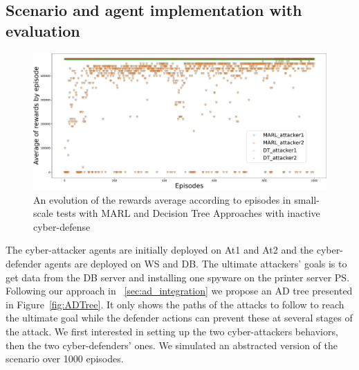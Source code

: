 \documentclass[conference]{IEEEtran}
\begin{document}



\subsection{Scenario and agent implementation with evaluation}

\begin{figure}
    \centering
    \includegraphics[width=\linewidth]{figures/graphs.pdf}
    \caption{An evolution of the rewards average according to episodes in small-scale tests with MARL and Decision Tree Approaches with inactive cyber-defense
    }
    \label{fig:graphs}
\end{figure}

\noindent
The cyber-attacker agents are initially deployed on At1 and At2 and the cyber-defender agents are deployed on WS and DB. The ultimate attackers' goals is to get data from the DB server and installing one spyware on the printer server PS. Following our approach in ~\ref{sec:ad_integration} we propose an AD tree presented in Figure~\ref{fig:ADTree}. It only shows the paths of the attacks to follow to reach the ultimate goal while the defender actions can prevent these at several stages of the attack.
We first interested in setting up the two cyber-attackers behaviors, then the two cyber-defenders' ones. We simulated an abstracted version of the scenario over 1000 episodes.

\end{document}
